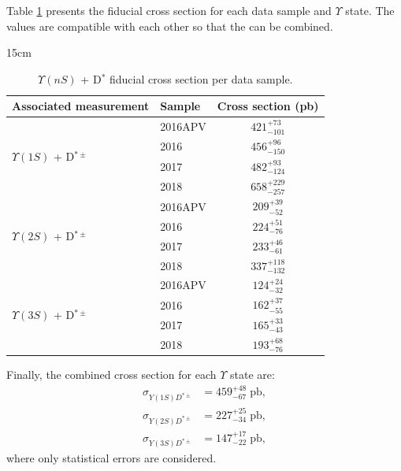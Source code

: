 Table \ref{tab:DPS_xsec} presents the fiducial cross section for each data sample and $\Upsilon$ state. The values are compatible with each other so that the can be combined.

\begin{table}[!htbp]{15cm}
  \caption{$\Upsilon(nS)$ + D$^{*}$ fiducial cross section per data sample.}
  \begin{tabular}{ l | l | c }
    \hline
    Associated measurement & Sample & Cross section (pb) \\ \hline
    \multirow[c]{4}{*}{$\Upsilon(1S)$ + D$^{*\pm}$} 
    & 2016APV & $421^{+73}_{-101}$ \bigstrut\\\cline{2-3} 
    & 2016    & $456^{+96}_{-150}$ \bigstrut\\\cline{2-3} 
    & 2017    & $482^{+93}_{-124}$ \bigstrut\\\cline{2-3} 
    & 2018    & $658^{+229}_{-257}$ \\ \hline
    \multirow[c]{4}{*}{$\Upsilon(2S)$ + D$^{*\pm}$} 
    & 2016APV & $209^{+39}_{-52}$ \bigstrut\\\cline{2-3} 
    & 2016    & $224^{+51}_{-76}$ \bigstrut\\\cline{2-3} 
    & 2017    & $233^{+46}_{-61}$ \bigstrut\\\cline{2-3} 
    & 2018    & $337^{+118}_{-132}$ \\ \hline
    \multirow[c]{4}{*}{$\Upsilon(3S)$ + D$^{*\pm}$} 
    & 2016APV & $124^{+24}_{-32}$ \bigstrut\\\cline{2-3} 
    & 2016    & $162^{+37}_{-55}$ \bigstrut\\\cline{2-3} 
    & 2017    & $165^{+33}_{-43}$ \bigstrut\\\cline{2-3} 
    & 2018    & $193^{+68}_{-76}$ \\ \hline
  \end{tabular}
  \label{tab:DPS_xsec}
\end{table}

Finally, the combined cross section for each $\Upsilon$ state are:
\begin{equation}
\begin{split}
  \sigma_{Y(1S)D^{*\pm}} &= 459^{+48}_{-67} \; \text{pb},\\
  \sigma_{Y(2S)D^{*\pm}} &= 227^{+25}_{-34} \; \text{pb},\\
  \sigma_{Y(3S)D^{*\pm}} &= 147^{+17}_{-22} \; \text{pb},
\end{split} 
\end{equation}
where only statistical errors are considered.

